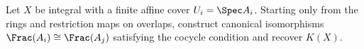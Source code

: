 \begin{problem}\label{chal:vi27-01}
Let $X$ be integral with a finite affine cover $U_i=\Spec A_i$.  Starting only from the rings and restriction maps on overlaps, construct canonical isomorphisms $\Frac(A_i)\cong\Frac(A_j)$ satisfying the cocycle condition and recover $K(X)$.
\end{problem}
